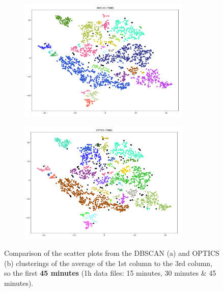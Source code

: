 \begin{figure}[H]
	\centering
	\begin{subfigure}{.5\textwidth}
    \centering
    \includegraphics[width=0.9\textwidth]{./images/clusteringResults/1h-3-DBSCAN.png}
  \end{subfigure}%
  \begin{subfigure}{.5\textwidth}
    \centering
    \includegraphics[width=0.9\textwidth]{./images/clusteringResults/1h-3-OPTICS.png}
	\end{subfigure}
	\caption{Comparison of the scatter plots from the DBSCAN (a) and OPTICS (b) clusterings of the average of the 1st column to the 3rd column, so the first \textbf{45 minutes} (1h data files: 15 minutes, 30 minutes \& 45 minutes).}
  \label{figure:finalClustering1h-3}
\end{figure}

